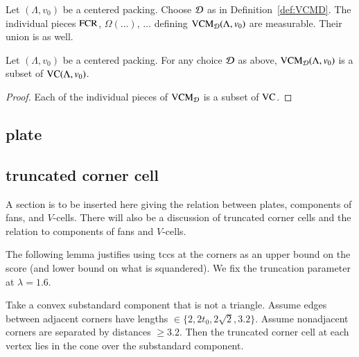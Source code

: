 \begin{lemma}
Let $(\Lambda,v_0)$ be a centered packing.  Choose ${\mathcal D}$ as in Definition~\ref{def:VCMD}.  
The individual pieces ${\operatorname{FCR}}$, $\Omega(\ldots)$, $\ldots$ 
defining ${\operatorname{VCM}}_{{\mathcal D}}(\Lambda,v_0)$ are measurable.  Their union is as well.
\end{lemma}

\begin{lemma}
Let $(\Lambda,v_0)$ be a centered packing.
For any choice ${\mathcal D}$ as above,  ${\operatorname{VCM}}_{{\mathcal D}}(\Lambda,v_0)$ is a subset of ${\operatorname{VC}}(\Lambda,v_0)$.
\end{lemma}

\begin{proof}  Each of the individual pieces of ${\operatorname{VCM}}_{{\mathcal D}}$ is a subset of ${\operatorname{VC}}$.
\end{proof}





\subsection{plate}


\subsection{truncated corner cell} %

A section is to be inserted here giving the relation between
plates, components of fans, and $V$-cells.  There will also
be a discussion of truncated corner cells and the relation to
components of fans and $V$-cells.%


The following lemma justifies using tccs at the corners as an upper
bound on the score (and lower bound on what is squandered). We fix the
truncation parameter at $\lambda=1.6$.

\begin{lemma}
Take a convex substandard component that is not a triangle.  Assume edges between
adjacent corners have lengths $\in\{2,2t_0,2\sqrt{2},3.2\}$. Assume
nonadjacent corners are separated by distances $\ge3.2$.  Then the
truncated corner cell at each vertex lies in the cone over the
substandard component.
\end{lemma}

